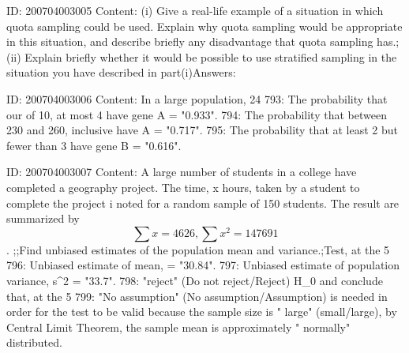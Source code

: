 \documentclass{article}
\begin{document}
ID: 200704003005
Content:
(i) Give a real-life example of a situation in which quota sampling could be used. Explain why quota sampling would be appropriate in this situation, and describe briefly any disadvantage that quota sampling has.;(ii) Explain briefly whether it would be possible to use stratified sampling in the situation you have described in part(i)Answers:

ID: 200704003006
Content:
In a large population, 24%
793: The probability that our of 10, at most 4 have gene A = "0.933".
794: The probability that between 230 and 260, inclusive have A = "0.717".
795: The probability that at least 2 but fewer than 3 have gene B = "0.616".

ID: 200704003007
Content:
A large number of students in a college have completed a geography project. The time, x hours, taken by a student to complete the project i noted for a random sample of 150 students. The result are summarized by $$ \sum x = 4626, \sum x^2 = 147691$$. ;;Find unbiased estimates of the population mean and variance.;Test, at the 5%
796: Unbiased estimate of mean, \mu = "30.84".
797: Unbiased estimate of population variance, s^2 = "33.7".
798: "reject" (Do not reject/Reject) H_0 and conclude that, at the 5%
799: "No assumption" (No assumption/Assumption) is needed in order for the test to be valid because the sample size is " large" (small/large), by Central Limit Theorem, the sample mean is approximately " normally" distributed.
\end{document}
